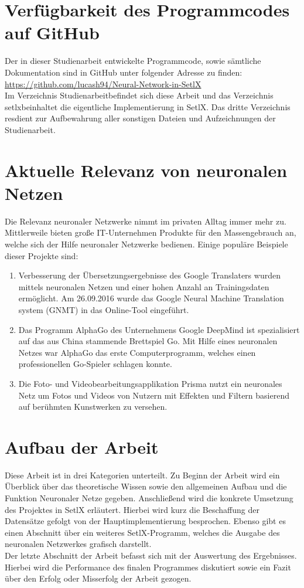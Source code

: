 \section{Verfügbarkeit des Programmcodes auf GitHub}
Der in dieser Studienarbeit entwickelte Programmcode, sowie sämtliche Dokumentation sind in GitHub unter folgender Adresse zu finden:
\\[0.2cm]
\hspace*{1.3cm}
\href{https://github.com/lucash94/Neural-Network-in-SetlX/}{https://github.com/lucash94/Neural-Network-in-SetlX}
\\[0.2cm]
Im Verzeichnis \glqq Studienarbeit\grqq befindet sich diese Arbeit und das Verzeichnis \glqq setlx\grqq beinhaltet die eigentliche Implementierung in SetlX. Das dritte Verzeichnis \glqq res\grqq dient zur Aufbewahrung aller sonstigen Dateien und Aufzeichnungen der Studienarbeit.

\section{Aktuelle Relevanz von neuronalen Netzen}
Die Relevanz neuronaler Netzwerke nimmt im privaten Alltag immer mehr zu. Mittlerweile bieten große IT-Unternehmen Produkte für den Massengebrauch an, welche sich der Hilfe neuronaler Netzwerke bedienen. Einige populäre Beispiele dieser Projekte sind:
\begin{enumerate}
\item Verbesserung der Übersetzungsergebnisse des Google Translaters wurden mittels neuronalen Netzen und einer hohen Anzahl an Trainingsdaten ermöglicht. Am 26.09.2016 wurde das Google Neural Machine Translation system (GNMT) in das Online-Tool eingeführt. \cite{gnmt:2017}
\item Das Programm AlphaGo des Unternehmens Google DeepMind ist spezialisiert auf das aus China stammende Brettspiel Go. Mit Hilfe eines neuronalen Netzes war AlphaGo das erste Computerprogramm, welches einen professionellen Go-Spieler schlagen konnte. \cite{alphago:2017}
\item Die Foto- und Videobearbeitungsapplikation Prisma nutzt ein neuronales Netz um Fotos und Videos von Nutzern mit Effekten und Filtern basierend auf berühmten Kunstwerken zu versehen. \cite{prismaai:2017}
\end{enumerate}

\section{Aufbau der Arbeit}
Diese Arbeit ist in drei Kategorien unterteilt. Zu Beginn der Arbeit wird ein Überblick über das theoretische Wissen sowie den allgemeinen Aufbau und die Funktion Neuronaler Netze gegeben. Anschließend wird die konkrete Umsetzung des Projektes in SetlX erläutert. Hierbei wird kurz die Beschaffung der Datensätze gefolgt von der Hauptimplementierung besprochen. Ebenso gibt es einen Abschnitt über ein weiteres SetlX-Programm, welches die Ausgabe des neuronalen Netzwerkes grafisch darstellt. \\
Der letzte Abschnitt der Arbeit befasst sich mit der Auswertung des Ergebnisses. Hierbei wird die Performance des finalen Programmes diskutiert sowie ein Fazit über den Erfolg oder Misserfolg der Arbeit gezogen.